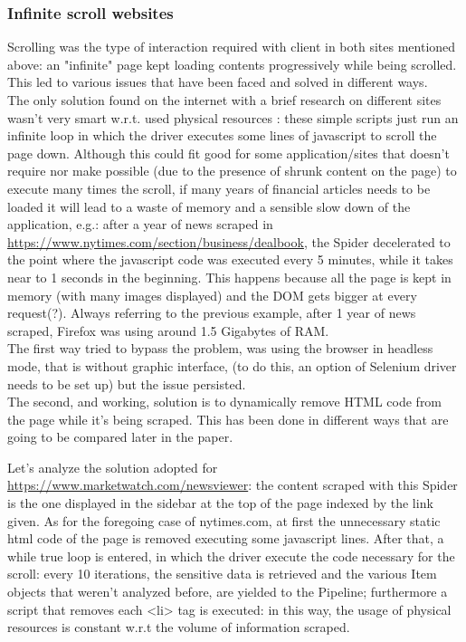 \subsubsection{Infinite scroll websites}
Scrolling was the type of interaction required with client in both sites mentioned above: an "infinite" page kept loading contents progressively while being scrolled. This led to various issues that have been faced and solved in different ways. \\
The only solution found on the internet with a brief research on different sites wasn't very smart w.r.t. used physical resources \cite{currentscrollsolution}: these simple scripts just run an infinite loop in which the driver executes some lines of javascript to scroll the page down. Although this could fit good for some application/sites that doesn't require nor make possible (due to the presence of shrunk content on the page) to execute many times the scroll, if many years of financial articles needs to be loaded it will lead to a waste of memory and a sensible slow down of the application, e.g.:  after a year of news scraped in \url{https://www.nytimes.com/section/business/dealbook}, the Spider decelerated to the point where the javascript code was executed every 5 minutes, while it takes near to 1 seconds in the beginning. This happens because all the page is kept in memory (with many images displayed) and the DOM gets bigger at every request(?). Always referring to the previous example, after 1 year of news scraped, Firefox was using around 1.5 Gigabytes of RAM. \\
The first way tried to bypass the problem, was using the browser in headless mode, that is without graphic interface, (to do this, an option of Selenium driver needs to be set up) but the issue persisted. \\
The second, and working, solution is to dynamically remove HTML code from the page while it's being scraped. This has been done in different ways that are going to be compared later in the paper. 
\par 
\par 
Let's analyze the solution adopted for \url{https://www.marketwatch.com/newsviewer}: the content scraped with this Spider is the one displayed in the sidebar at the top of the page indexed by the link given. As for the foregoing case of nytimes.com, at first the unnecessary static html code of the page is removed executing some javascript lines. After that, a while true loop is entered, in which the driver execute the code necessary for the scroll: every 10 iterations, the sensitive data is retrieved and the various Item objects that weren't analyzed before, are yielded to the Pipeline; furthermore a script that removes each <li> tag is executed: in this way, the usage of physical resources is constant w.r.t the volume of information scraped. \\
